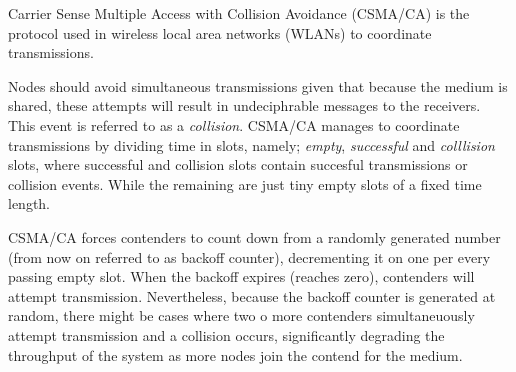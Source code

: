 Carrier Sense Multiple Access with Collision Avoidance (CSMA/CA) is the protocol used in wireless local area networks (WLANs) to coordinate transmissions.

Nodes should avoid simultaneous transmissions given that because the medium is shared, these attempts will result in undeciphrable messages to the receivers. This event is referred to as a \emph{collision}. CSMA/CA manages to coordinate transmissions by dividing time in slots, namely; \emph{empty}, \emph{successful} and \emph{colllision} slots, where successful and collision slots contain succesful transmissions or collision events. While the remaining are just tiny empty slots of a fixed time length.

CSMA/CA forces contenders to count down from a randomly generated number (from now on referred to as backoff counter), decrementing it on one per every passing empty slot. When the backoff expires (reaches zero), contenders will attempt transmission. Nevertheless, because the backoff counter is generated at random, there might be cases where two o more contenders simultaneuously attempt transmission and a collision occurs, significantly degrading the throughput of the system as more nodes join the contend for the medium.